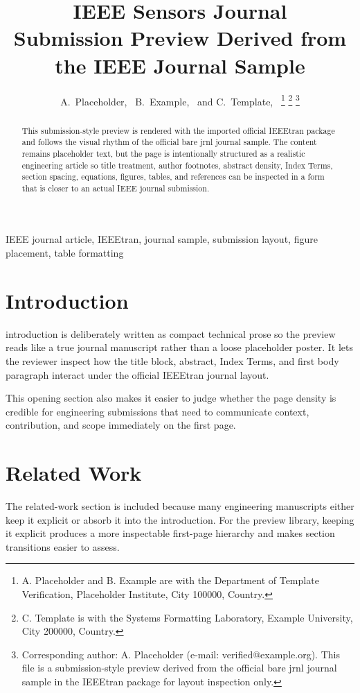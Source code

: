 \documentclass[journal]{IEEEtran}
\title{IEEE Sensors Journal\\\large Submission Preview Derived from the IEEE Journal Sample}
\author{A.~Placeholder,~\IEEEmembership{Member,~IEEE,}%
B.~Example,~\IEEEmembership{Senior Member,~IEEE,}%
and C.~Template,~\IEEEmembership{Member,~IEEE}%
\thanks{A. Placeholder and B. Example are with the Department of Template Verification, Placeholder Institute, City 100000, Country.}%
\thanks{C. Template is with the Systems Formatting Laboratory, Example University, City 200000, Country.}%
\thanks{Corresponding author: A. Placeholder (e-mail: verified@example.org). This file is a submission-style preview derived from the official bare jrnl journal sample in the IEEEtran package for layout inspection only.}}
\begin{document}
\maketitle
\begin{abstract}
This submission-style preview is rendered with the imported official IEEEtran package and follows the visual rhythm of the official bare jrnl journal sample. The content remains placeholder text, but the page is intentionally structured as a realistic engineering article so title treatment, author footnotes, abstract density, Index Terms, section spacing, equations, figures, tables, and references can be inspected in a form that is closer to an actual IEEE journal submission.
\end{abstract}
\begin{IEEEkeywords}
IEEE journal article, IEEEtran, journal sample, submission layout, figure placement, table formatting
\end{IEEEkeywords}
\section{Introduction}
 introduction is deliberately written as compact technical prose so the preview reads like a true journal manuscript rather than a loose placeholder poster. It lets the reviewer inspect how the title block, abstract, Index Terms, and first body paragraph interact under the official IEEEtran journal layout.

This opening section also makes it easier to judge whether the page density is credible for engineering submissions that need to communicate context, contribution, and scope immediately on the first page.
\section{Related Work}
The related-work section is included because many engineering manuscripts either keep it explicit or absorb it into the introduction. For the preview library, keeping it explicit produces a more inspectable first-page hierarchy and makes section transitions easier to assess.
\end{document}
